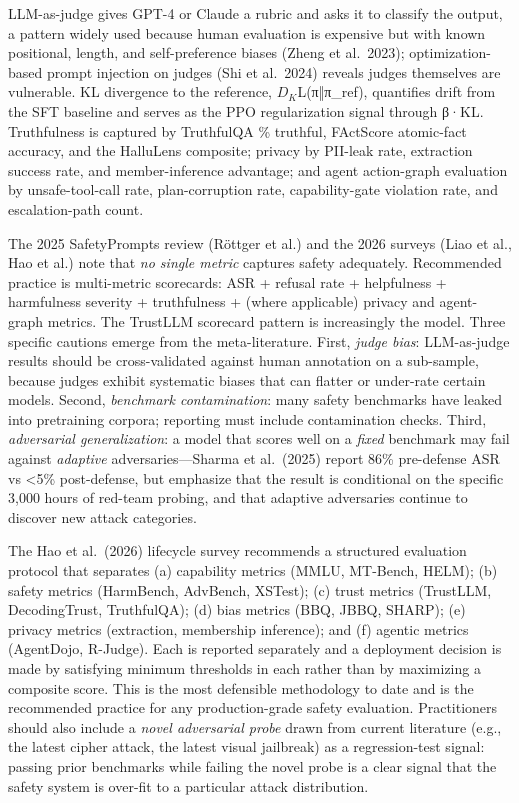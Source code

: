 LLM-as-judge gives GPT-4 or Claude a rubric and asks it to classify the output, a pattern widely used because human evaluation is expensive but with known positional, length, and self-preference biases (Zheng et al.~2023); optimization-based prompt injection on judges (Shi et al.~2024) reveals judges themselves are vulnerable. KL divergence to the reference, \(D_K\)L(π‖π\_ref), quantifies drift from the SFT baseline and serves as the PPO regularization signal through β·KL. Truthfulness is captured by TruthfulQA \% truthful, FActScore atomic-fact accuracy, and the HalluLens composite; privacy by PII-leak rate, extraction success rate, and member-inference advantage; and agent action-graph evaluation by unsafe-tool-call rate, plan-corruption rate, capability-gate violation rate, and escalation-path count.

The 2025 SafetyPrompts review (Röttger et al.) and the 2026 surveys (Liao et al., Hao et al.) note that \emph{no single metric} captures safety adequately. Recommended practice is multi-metric scorecards: ASR + refusal rate + helpfulness + harmfulness severity + truthfulness + (where applicable) privacy and agent-graph metrics. The TrustLLM scorecard pattern is increasingly the model. Three specific cautions emerge from the meta-literature. First, \emph{judge bias}: LLM-as-judge results should be cross-validated against human annotation on a sub-sample, because judges exhibit systematic biases that can flatter or under-rate certain models. Second, \emph{benchmark contamination}: many safety benchmarks have leaked into pretraining corpora; reporting must include contamination checks. Third, \emph{adversarial generalization}: a model that scores well on a \emph{fixed} benchmark may fail against \emph{adaptive} adversaries---Sharma et al.~(2025) report 86\% pre-defense ASR vs \textless5\% post-defense, but emphasize that the result is conditional on the specific 3,000 hours of red-team probing, and that adaptive adversaries continue to discover new attack categories.

The Hao et al.~(2026) lifecycle survey recommends a structured evaluation protocol that separates (a) capability metrics (MMLU, MT-Bench, HELM); (b) safety metrics (HarmBench, AdvBench, XSTest); (c) trust metrics (TrustLLM, DecodingTrust, TruthfulQA); (d) bias metrics (BBQ, JBBQ, SHARP); (e) privacy metrics (extraction, membership inference); and (f) agentic metrics (AgentDojo, R-Judge). Each is reported separately and a deployment decision is made by satisfying minimum thresholds in each rather than by maximizing a composite score. This is the most defensible methodology to date and is the recommended practice for any production-grade safety evaluation. Practitioners should also include a \emph{novel adversarial probe} drawn from current literature (e.g., the latest cipher attack, the latest visual jailbreak) as a regression-test signal: passing prior benchmarks while failing the novel probe is a clear signal that the safety system is over-fit to a particular attack distribution.

